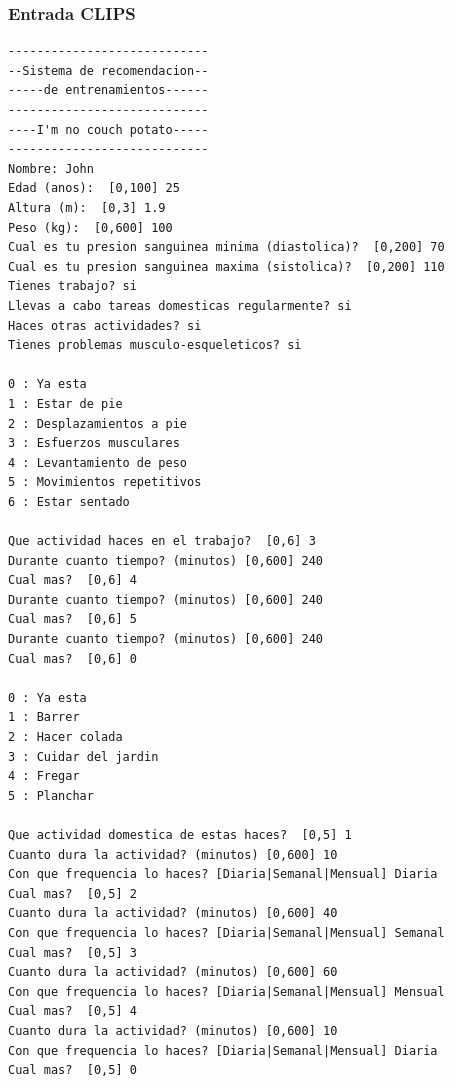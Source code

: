 \documentclass[a4paper, 12pt, UTF8]{article}
\begin{document}
\subsubsection{Entrada CLIPS}
\begin{verbatim}
----------------------------
--Sistema de recomendacion--
-----de entrenamientos------
----------------------------
----I'm no couch potato-----
----------------------------
Nombre: John
Edad (anos):  [0,100] 25
Altura (m):  [0,3] 1.9
Peso (kg):  [0,600] 100
Cual es tu presion sanguinea minima (diastolica)?  [0,200] 70
Cual es tu presion sanguinea maxima (sistolica)?  [0,200] 110
Tienes trabajo? si
Llevas a cabo tareas domesticas regularmente? si
Haces otras actividades? si
Tienes problemas musculo-esqueleticos? si

0 : Ya esta
1 : Estar de pie
2 : Desplazamientos a pie
3 : Esfuerzos musculares
4 : Levantamiento de peso
5 : Movimientos repetitivos
6 : Estar sentado

Que actividad haces en el trabajo?  [0,6] 3
Durante cuanto tiempo? (minutos) [0,600] 240
Cual mas?  [0,6] 4
Durante cuanto tiempo? (minutos) [0,600] 240
Cual mas?  [0,6] 5
Durante cuanto tiempo? (minutos) [0,600] 240
Cual mas?  [0,6] 0

0 : Ya esta
1 : Barrer
2 : Hacer colada
3 : Cuidar del jardin
4 : Fregar
5 : Planchar

Que actividad domestica de estas haces?  [0,5] 1
Cuanto dura la actividad? (minutos) [0,600] 10
Con que frequencia lo haces? [Diaria|Semanal|Mensual] Diaria
Cual mas?  [0,5] 2
Cuanto dura la actividad? (minutos) [0,600] 40
Con que frequencia lo haces? [Diaria|Semanal|Mensual] Semanal
Cual mas?  [0,5] 3
Cuanto dura la actividad? (minutos) [0,600] 60
Con que frequencia lo haces? [Diaria|Semanal|Mensual] Mensual
Cual mas?  [0,5] 4
Cuanto dura la actividad? (minutos) [0,600] 10
Con que frequencia lo haces? [Diaria|Semanal|Mensual] Diaria
Cual mas?  [0,5] 0


\end{verbatim}
\end{document}
